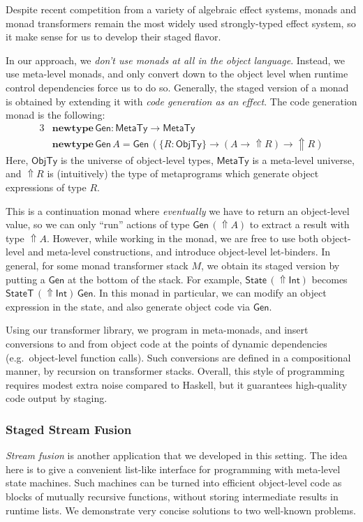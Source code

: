 \documentclass{easychair}
\newcommand{\msf}[1]{{\mathsf{#1}}}
\newcommand{\mbf}[1]{{\mathbf{#1}}}
\newcommand{\Up}{{\Uparrow}}
\newcommand{\MTy}{\msf{MetaTy}}
\theoremstyle{remark}
\newcommand{\Gen}{\msf{Gen}}
\newcommand{\StateT}{\msf{StateT}}
\newcommand{\newtype}{\mbf{newtype}\,}
\newcommand{\State}{\msf{State}}
\begin{document}
Despite recent competition from a variety of algebraic effect systems, monads
and monad transformers remain the most widely used strongly-typed effect system,
so it make sense for us to develop their staged flavor.

In our approach, we \emph{don't use monads at all in the object
language}. Instead, we use meta-level monads, and only convert down to the
object level when runtime control dependencies force us to do so. Generally, the
staged version of a monad is obtained by extending it with \emph{code generation
as an effect}. The code generation monad is the following:
\begin{alignat*}{3}
  &\newtype \Gen : \MTy \to \MTy \\
  &\newtype \Gen\,A = \Gen\,(\{R : \msf{ObjTy}\} \to (A \to \Up R) \to \Up R)
\end{alignat*}
Here, $\msf{ObjTy}$ is the universe of object-level types, $\MTy$ is a
meta-level universe, and $\Up R$ is (intuitively) the type of metaprograms which
generate object expressions of type $R$.

This is a continuation monad where \emph{eventually} we have to return an
object-level value, so we can only ``run'' actions of type $\Gen\,(\Up A)$ to
extract a result with type $\Up A$. However, while working in the monad, we are
free to use both object-level and meta-level constructions, and introduce
object-level let-binders. In general, for some monad transformer stack $M$, we
obtain its staged version by putting a $\Gen$ at the bottom of the stack. For
example, $\State\,(\Up\msf{Int})$ becomes $\StateT\,(\Up\msf{Int})\,\Gen$. In
this monad in particular, we can modify an object expression in the state, and
also generate object code via $\Gen$.

Using our transformer library, we program in meta-monads, and insert conversions
to and from object code at the points of dynamic dependencies
(e.g.\ object-level function calls). Such conversions are defined in a
compositional manner, by recursion on transformer stacks. Overall, this style of
programming requires modest extra noise compared to Haskell, but it guarantees
high-quality code output by staging.

\subsubsection*{Staged Stream Fusion}

\emph{Stream fusion} \cite{DBLP:phd/ethos/Coutts11} is another application that we developed in this
setting. The idea here is to give a convenient list-like interface for
programming with meta-level state machines. Such machines can be turned into
efficient object-level code as blocks of mutually recursive functions, without
storing intermediate results in runtime lists. We demonstrate very concise
solutions to two well-known problems.
\end{document}
